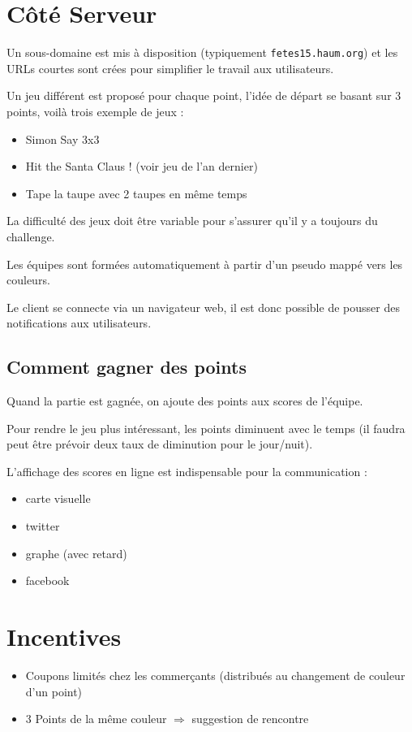 \documentclass[a4paper, 11pt]{article}
\begin{document}
\section{Côté Serveur}

Un sous-domaine est mis à disposition (typiquement \texttt{fetes15.haum.org}) et les URLs courtes sont crées pour
simplifier le travail aux utilisateurs.

Un jeu différent est proposé pour chaque point, l'idée de départ se basant sur 3 points, voilà trois exemple de jeux :

\begin{itemize}
	\item Simon Say 3x3
	\item Hit the Santa Claus ! (voir jeu de l'an dernier)
	\item Tape la taupe avec 2 taupes en même temps
\end{itemize}

La difficulté des jeux doit être variable pour s'assurer qu'il y a toujours du challenge.

Les équipes sont formées automatiquement à partir d'un pseudo mappé vers les couleurs.

Le client se connecte via un navigateur web, il est donc possible de pousser des notifications aux utilisateurs.

\subsection{Comment gagner des points}

Quand la partie est gagnée, on ajoute des points aux scores de l'équipe.

Pour rendre le jeu plus intéressant, les points diminuent avec le temps (il faudra peut être prévoir deux taux de
diminution pour le jour/nuit).

L'affichage des scores en ligne est indispensable pour la communication :

\begin{itemize}
	\item carte visuelle
	\item twitter
	\item graphe (avec retard)
	\item facebook
\end{itemize}

\section{Incentives}


\begin{itemize}
	\item Coupons limités chez les commerçants (distribués au changement de couleur d'un point)
	\item 3 Points de la même couleur $\Rightarrow$ suggestion de rencontre
\end{itemize}
\end{document}
